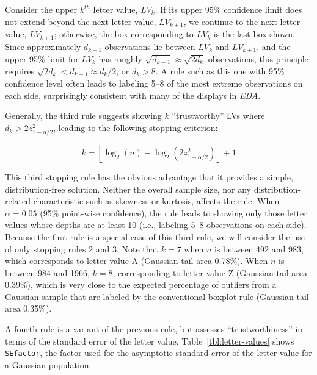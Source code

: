 \documentclass[oneside]{article}
\begin{document}
Consider the upper $k^{th}$ letter value, $LV_k$. If its upper 95\% confidence limit does not extend beyond the next letter value, $LV_{k+1}$, we continue to the next letter value, $LV_{k+1}$; otherwise, the box corresponding to $LV_k$ is the last box shown. Since approximately $d_{k+1}$ observations lie between $LV_k$ and $LV_{k+1}$, and the upper 95\% limit for $LV_k$ has roughly $\sqrt{d_{k-1}} \approx \sqrt{2 d_k }$ observations, this principle requires $\sqrt{2 d_k} < d_{k+1} \approx d_k / 2$, or $d_k > 8$. A rule such as this one with 95\% confidence level often leads to labeling 5--8 of the most extreme observations on each side, surprisingly consistent with many of the displays in \textit{EDA}.

Generally, the third rule suggests showing $k$ ``trustworthy'' LVs where $d_k > 2 z_{1-\alpha/2}^2 $, leading to the following stopping criterion:

\begin{equation}
k =  \left \lfloor \log_2 (n) - \log_2 
   \left(2  z_{1-\alpha/2}^2 \right) \right \rfloor + 1
\end{equation}

\noindent This third stopping rule has the obvious advantage that it provides a simple, distribution-free solution. Neither the overall sample size, nor any distribution-related characteristic such as skewness or kurtosis, affects the rule. When $\alpha = 0.05$ (95\% point-wise confidence), the rule leads to showing only those letter values whose depths are at least 10 (i.e., labeling 5--8 observations on each side). Because the first rule is a special case of this third rule, we will consider the use of only stopping rules 2 and 3. Note that $k = 7$ when $n$ is between 492 and 983, which corresponds to letter value A (Gaussian tail area 0.78\%). When $n$ is between 984 and 1966, $k = 8$, corresponding to letter value Z (Gaussian tail area 0.39\%), which is very close to the expected percentage of outliers from a Gaussian sample that are labeled by the conventional boxplot rule (Gaussian tail area 0.35\%).


A fourth rule is a variant of the previous rule, but assesses ``trustworthiness'' in terms of the standard error of the letter value. Table~\ref{tbl:letter-values} shows \texttt{SEfactor}, the factor used for the asymptotic standard error of the letter value for a Gaussian population:
\end{document}
